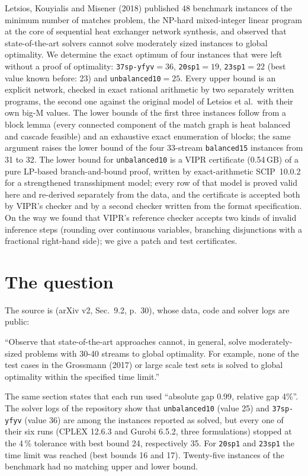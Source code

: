 \documentclass[11pt,a4paper]{report}
\newcommand*{\inst}[1]{\texttt{#1}}
\begin{document}
\makepapertitle

\begin{paperabstract}
Letsios, Kouyialis and Misener (2018) published 48 benchmark instances of the minimum number of matches problem,
the NP-hard mixed-integer linear program at the core of sequential heat exchanger network synthesis, and observed
that state-of-the-art solvers cannot solve moderately sized instances to global optimality. We determine the exact
optimum of four instances that were left without a proof of optimality: \inst{37sp-yfyv}${}=36$,
\inst{20sp1}${}=19$, \inst{23sp1}${}=22$ (best value known before: 23) and \inst{unbalanced10}${}=25$. Every upper
bound is an explicit network, checked in exact rational arithmetic by two separately written programs, the
second one against the original model of Letsios et al.\ with their own big-M values. The lower bounds of the first
three instances follow from a block lemma (every connected component of the match graph is heat balanced and
cascade feasible) and an exhaustive exact enumeration of blocks; the same argument raises the lower bound of the four
33-stream \inst{balanced15} instances from 31 to 32. The lower bound for \inst{unbalanced10} is a VIPR certificate
(0.54\,GB) of a pure LP-based branch-and-bound proof, written by exact-arithmetic SCIP~10.0.2 for a strengthened
transshipment model; every row of that model is proved valid here and re-derived separately from the data, and
the certificate is accepted both by VIPR's checker and by a second checker written from the format specification.
On the way we found that VIPR's reference checker accepts two kinds of invalid inference steps (rounding over
continuous variables, branching disjunctions with a fractional right-hand side); we give a patch and test
certificates.
\end{paperabstract}

\section*{The question}

The source is \textcite{LKM2018} (arXiv v2, Sec.~9.2, p.~30), whose data, code and solver logs are public:
\begin{openquote}
``Observe that state-of-the-art approaches cannot, in general, solve moderately-sized problems with 30-40 streams
to global optimality. For example, none of the test cases in the Grossmann (2017) or large scale test sets is
solved to global optimality within the specified time limit.''
\end{openquote}
The same section states that each run used ``absolute gap 0.99, relative gap 4\%''. The solver logs of the
repository show that \inst{unbalanced10} (value 25) and \inst{37sp-yfyv} (value 36) are among the instances
reported as solved, but every one of their six runs (CPLEX 12.6.3 and Gurobi 6.5.2, three formulations) stopped at
the 4\,\% tolerance with best bound 24, respectively 35. For \inst{20sp1} and \inst{23sp1} the time limit was
reached (best bounds 16 and 17). Twenty-five instances of the benchmark had no matching upper and lower bound.
\end{document}
